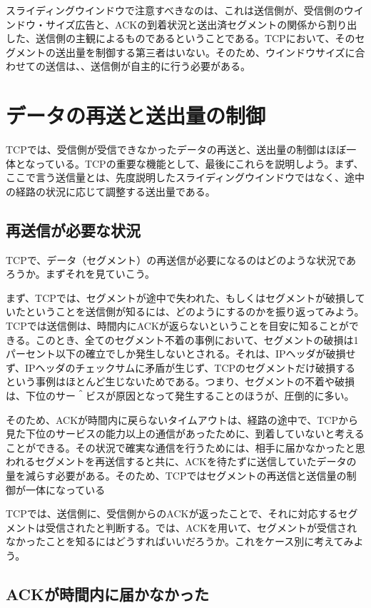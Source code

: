 スライディングウインドウで注意すべきなのは、これは送信側が、受信側のウインドウ・サイズ広告と、ACKの到着状況と送出済セグメントの関係から割り出した、送信側の主観によるものであるということである。TCPにおいて、そのセグメントの送出量を制御する第三者はいない。そのため、ウインドウサイズに合わせての送信は、、送信側が自主的に行う必要がある。

\section{データの再送と送出量の制御}

TCPでは、受信側が受信できなかったデータの再送と、送出量の制御はほぼ一体となっている。TCPの重要な機能として、最後にこれらを説明しよう。まず、ここで言う送信量とは、先度説明したスライディングウインドウではなく、途中の経路の状況に応じて調整する送出量である。

\subsection{再送信が必要な状況}

TCPで、データ（セグメント）の再送信が必要になるのはどのような状況であろうか。まずそれを見ていこう。

まず、TCPでは、セグメントが途中で失われた、もしくはセグメントが破損していたということを送信側が知るには、どのようにするのかを振り返ってみよう。TCPでは送信側は、時間内にACKが返らないということを目安に知ることができる。このとき、全てのセグメント不着の事例において、セグメントの破損は1パーセント以下の確立でしか発生しないとされる。それは、IPヘッダが破損せず、IPヘッダのチェックサムに矛盾が生じず、TCPのセグメントだけ破損するという事例はほとんど生じないためである。つまり、セグメントの不着や破損は、下位のサー＾ビスが原因となって発生することのほうが、圧倒的に多い。

そのため、ACKが時間内に戻らないタイムアウトは、経路の途中で、TCPから見た下位のサービスの能力以上の通信があったために、到着していないと考えることができる。その状況で確実な通信を行うためには、相手に届かなかったと思われるセグメントを再送信すると共に、ACKを待たずに送信していたデータの量を減らす必要がある。そのため、TCPではセグメントの再送信と送信量の制御が一体になっている

TCPでは、送信側に、受信側からのACKが返ったことで、それに対応するセグメントは受信されたと判断する。では、ACKを用いて、セグメントが受信されなかったことを知るにはどうすればいいだろうか。これをケース別に考えてみよう。

\subsection{ACKが時間内に届かなかった}

